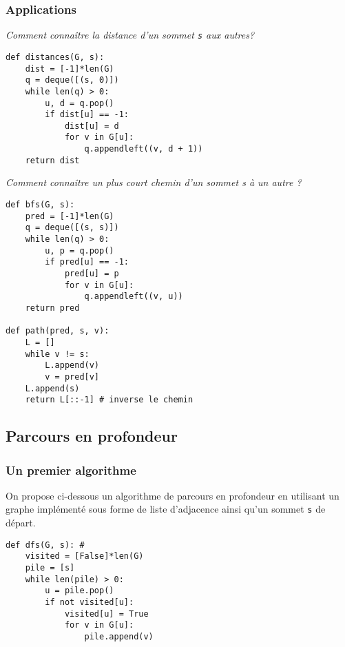 \subsubsection{Applications}
\begin{exemple}
\textit{Comment connaître la distance d'un sommet \texttt{s} aux autres?}
\ifprof
\begin{lstlisting}
def distances(G, s):
    dist = [-1]*len(G)
    q = deque([(s, 0)])
    while len(q) > 0:
        u, d = q.pop()
        if dist[u] == -1:
            dist[u] = d
            for v in G[u]:
                q.appendleft((v, d + 1))
    return dist
\end{lstlisting}
\else
\vspace{5cm}
\fi
\end{exemple}

\begin{exemple}
\textit{Comment connaître un plus court chemin d’un sommet s à un autre ? }
\ifprof
\begin{lstlisting}
def bfs(G, s):
    pred = [-1]*len(G)
    q = deque([(s, s)])
    while len(q) > 0:
        u, p = q.pop()
        if pred[u] == -1:
            pred[u] = p
            for v in G[u]:
                q.appendleft((v, u))
    return pred
    
def path(pred, s, v):
    L = []
    while v != s:
        L.append(v)
        v = pred[v]
    L.append(s)
    return L[::-1] # inverse le chemin
\end{lstlisting}
\else
\vspace{10cm}
\fi
\end{exemple}


\subsection{Parcours en profondeur}
\subsubsection{Un premier algorithme}

On propose ci-dessous un algorithme de parcours en profondeur en utilisant un graphe implémenté sous forme de liste d'adjacence ainsi qu'un sommet \texttt{s} de départ. 

\begin{lstlisting}
def dfs(G, s): #
    visited = [False]*len(G)
    pile = [s]
    while len(pile) > 0:
        u = pile.pop()
        if not visited[u]:
            visited[u] = True
            for v in G[u]:
                pile.append(v)
\end{lstlisting}


